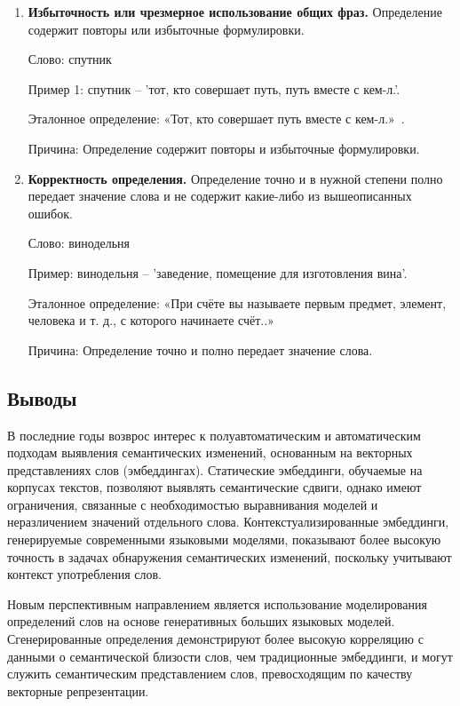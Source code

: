 \documentclass[LI,VKR]{HSEUniversity}
\begin{document}
\begin{enumerate}
\item \textbf{Избыточность или чрезмерное использование общих фраз.} Определение содержит повторы или избыточные формулировки.

%
%
%

   Слово: спутник

   Пример 1: спутник – ’тот, кто совершает путь, путь вместе с кем-л.’.

   Эталонное определение: «Тот, кто совершает путь вместе с кем-л.»~\cite{TolkovyKuznetsov}.

   Причина: Определение содержит повторы и избыточные формулировки.

\item \textbf{Корректность определения.} Определение точно и в нужной степени полно передает значение слова и не содержит какие-либо из вышеописанных ошибок.

   Слово: винодельня

   Пример: винодельня – ’заведение, помещение для изготовления вина’.

   Эталонное определение: «При счёте вы называете первым предмет, элемент, человека и т. д., с которого начинаете счёт..»~\cite{TolkovyDmitriev}

   Причина: Определение точно и полно передает значение слова.
\end{enumerate}

\subsection*{Выводы}

В последние годы возврос интерес к полуавтоматическим
и автоматическим подходам выявления семантических изменений,
основанным на векторных представлениях слов (эмбеддингах).
Статические эмбеддинги, обучаемые на корпусах текстов, позволяют выявлять семантические сдвиги,
однако имеют ограничения, связанные с необходимостью выравнивания моделей и неразличением значений
отдельного слова.
Контекстуализированные эмбеддинги, генерируемые современными языковыми моделями,
показывают более высокую точность в задачах обнаружения семантических изменений,
поскольку учитывают контекст употребления слов.

Новым перспективным направлением является использование моделирования определений слов
на основе генеративных больших языковых моделей.
Сгенерированные определения демонстрируют более высокую корреляцию с данными о семантической близости слов,
чем традиционные эмбеддинги, и могут служить семантическим представлением слов,
превосходящим по качеству векторные репрезентации.
\end{document}
